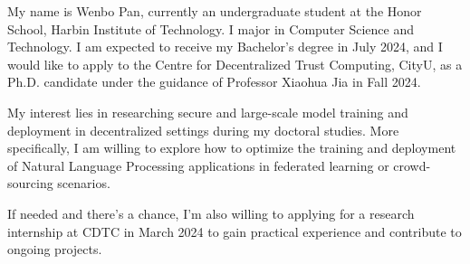 \documentclass{article}
\begin{document}
My name is Wenbo Pan, currently an undergraduate student at the Honor School, Harbin Institute of Technology. I major in Computer Science and Technology. I am expected to receive my Bachelor's degree in July 2024, and I would like to apply to the Centre for Decentralized Trust Computing, CityU, as a Ph.D. candidate under the guidance of Professor Xiaohua Jia in Fall 2024.

My interest lies in researching secure and large-scale model training and deployment in decentralized settings during my doctoral studies. More specifically, I am willing to explore how to optimize the training and deployment of Natural Language Processing applications in federated learning or crowd-sourcing scenarios.

If needed and there's a chance, I'm also willing to applying for a research internship at CDTC in March 2024 to gain practical experience and contribute to ongoing projects.
\end{document}
